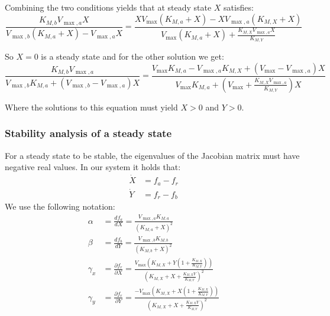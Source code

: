 Combining the two conditions yields that at steady state $X$ satisfies:
\begin{equation*}
    \frac{K_{M,b}V_{\max,a}X}{V_{\max,b}(K_{M,a}+X)-V_{\max,a}X}=\frac{XV_{\max}(K_{M,a}+X)-XV_{\max,a}(K_{M,X}+X)}{V_{\max}(K_{M,a}+X)+\frac{K_{M,X}V_{\max,a}X}{K_{M,Y}}}
\end{equation*}

So $X=0$ is a steady state and for the other solution we get:
\begin{equation*}
    \frac{K_{M,b}V_{\max,a}}{V_{\max,b}K_{M,a}+(V_{\max,b}-V_{\max,a})X}=\frac{V_{\max}K_{M,a}-V_{\max,a}K_{M,X}+(V_{\max}-V_{\max,a})X}{V_{\max}K_{M,a}+(V_{\max}+\frac{K_{M,X}V_{\max,a}}{K_{M,Y}})X}
\end{equation*}

Where the solutions to this equation must yield $X>0$ and $Y>0$.


\subsubsection{Stability analysis of a steady state}
For a steady state to be stable, the eigenvalues of the Jacobian matrix must have negative real values.
In our system it holds that:
    \begin{align*}
        \dot{X} & =f_a-f_r \\
        \dot{Y} & =f_r-f_b
    \end{align*}
We use the following notation:
\begin{align*}
  \alpha & =\frac{df_a}{dX}=\frac{V_{\max,a}K_{M,a}}{(K_{M,a}+X)^2} \\
  \beta & =\frac{df_b}{dY}=\frac{V_{\max,b}K_{M,b}}{(K_{M,b}+X)^2} \\
  \gamma_x & =\frac{\partial f_r}{\partial X}= \frac{V_{\max}(K_{M,X}+Y(1+\frac{K_{M,X}}{K_{M,Y}}))}{(K_{M,X}+X+\frac{K_{M,X}Y}{K_{M,Y}})^2}
\\
  \gamma_y & =\frac{\partial f_r}{\partial Y}= \frac{-V_{\max}(K_{M,X}+X(1+\frac{K_{M,X}}{K_{M,Y}}))}{(K_{M,X}+X+\frac{K_{M,X}Y}{K_{M,Y}})^2} 
\end{align*}

